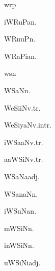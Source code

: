\begin{multicols*}{2}
\begin{dictroot}{wr}{p}
    \begin{dictentry}{iWRuPa}{n.}
    \end{dictentry}
    \begin{dictentry}{WRuuP}{n.}
    \end{dictentry}
    \begin{dictentry}{WRaPia}{n.}
    \end{dictentry}
\end{dictroot}

\begin{dictroot}{ws}{n}
    \begin{dictentry}{WSaN}{n.}
    \end{dictentry}
    \begin{dictentry}{WeSiiN}{v.tr.}
    \end{dictentry}
    \begin{dictentry}{WeSiyaN}{v.intr.}
    \end{dictentry}
    \begin{dictentry}{iWSaaN}{v.tr.}
    \end{dictentry}
    \begin{dictentry}{aaWSiN}{v.tr.}
    \end{dictentry}
    \begin{dictentry}{WSaNa}{adj.}
    \end{dictentry}
    \begin{dictentry}{WSanaN}{n.}
    \end{dictentry}
    \begin{dictentry}{iWSuNa}{n.}
    \end{dictentry}
    \begin{dictentry}{mWSiN}{n.}
    \end{dictentry}
    \begin{dictentry}{inWSiN}{n.}
    \end{dictentry}
    \begin{dictentry}{uWSiNi}{adj.}
    \end{dictentry}
\end{dictroot}

\end{multicols*}

